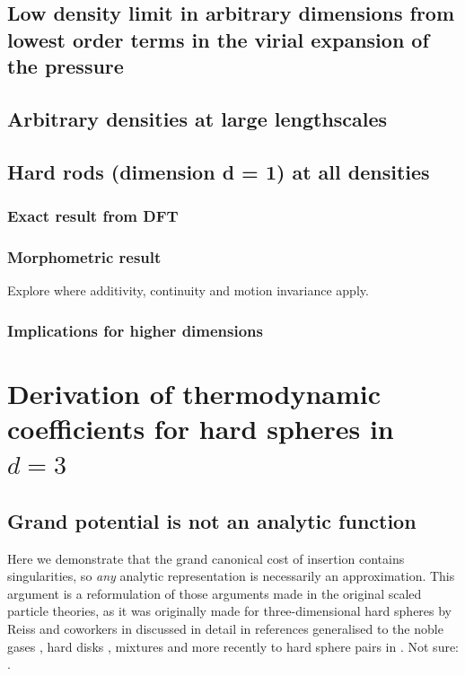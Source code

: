 \documentclass[11pt]{report}
\begin{document}
\subsection{Low density limit in arbitrary dimensions from lowest order terms in the virial expansion of the pressure}
\subsection{Arbitrary densities at large lengthscales}
\subsection{Hard rods (dimension d = 1) at all densities}
\subsubsection{Exact result from DFT}
\subsubsection{Morphometric result}
Explore where additivity, continuity and motion invariance apply.
\subsubsection{Implications for higher dimensions}

\section{Derivation of thermodynamic coefficients for hard spheres in $d = 3$}

\subsection{Grand potential is not an analytic function}

Here we demonstrate that the grand canonical cost of insertion contains singularities, so \emph{any} analytic representation is necessarily an approximation.
This argument is a reformulation of those arguments made in the original scaled particle theories, as it was originally made for three-dimensional hard spheres by Reiss and coworkers in \cite{Reiss1959,Reiss1960,Mandell1976} discussed in detail in references 
generalised to the noble gases \cite{Helfand1960}, hard disks \cite{Helfand1961}, mixtures \cite{Lebowitz1965} and more recently to hard sphere pairs in \cite{Stillinger2006,Chatterjee2006}.
Not sure: \cite{Reiss1961,Frisch1964,Reiss1965,Reiss1974,Tully-Smith1970,Harris1971}.
\end{document}
